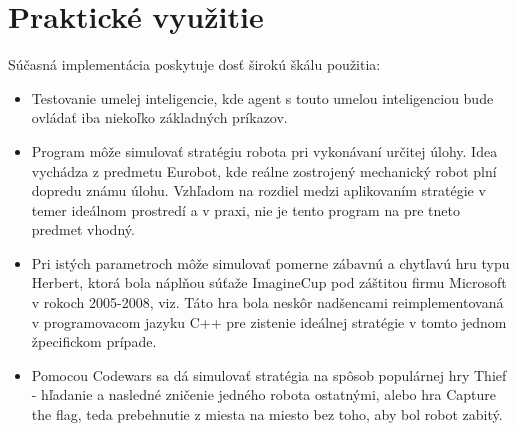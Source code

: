 \documentclass[12pt,notitlepage]{report}
\begin{document}
\section{Praktické využitie}
Súčasná implementácia poskytuje dosť širokú škálu použitia:\\
	\begin{itemize}
	\item Testovanie umelej inteligencie, kde agent s touto umelou inteligenciou bude ovládať iba niekoľko základných príkazov.
	\item Program môže simulovať stratégiu robota pri vykonávaní určitej úlohy. Idea vychádza z predmetu Eurobot, kde reálne zostrojený mechanický robot plní dopredu známu úlohu. Vzhľadom na rozdiel medzi aplikovaním stratégie v temer ideálnom prostredí a v praxi, nie je tento program na pre tneto predmet vhodný.
	\item Pri istých parametroch môže simulovať pomerne zábavnú a chytľavú hru typu Herbert, ktorá bola náplňou súťaže ImagineCup pod záštitou firmu Microsoft v rokoch 2005-2008, viz\cite{imaginecup}. Táto hra bola neskôr nadšencami reimplementovaná v programovacom jazyku C++ pre zistenie ideálnej stratégie v tomto jednom žpecifickom prípade. %
	\item Pomocou Codewars sa dá simulovať stratégia na spôsob populárnej hry Thief - hľadanie a nasledné zničenie jedného robota ostatnými, alebo hra Capture the flag, teda prebehnutie z miesta na miesto bez toho, aby bol robot zabitý.
	\end{itemize}


\end{document}
